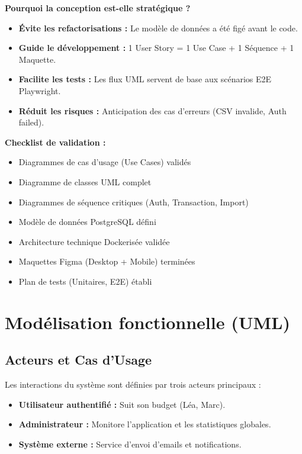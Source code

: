 \begin{conseil}
\textbf{Pourquoi la conception est-elle stratégique ?}
\begin{itemize}
    \item \textbf{Évite les refactorisations :} Le modèle de données a été figé avant le code.
    \item \textbf{Guide le développement :} 1 User Story = 1 Use Case + 1 Séquence + 1 Maquette.
    \item \textbf{Facilite les tests :} Les flux UML servent de base aux scénarios E2E Playwright.
    \item \textbf{Réduit les risques :} Anticipation des cas d'erreurs (CSV invalide, Auth failed).
\end{itemize}

\textbf{Checklist de validation :}
\begin{itemize}
    \item[\mycheckmark] Diagrammes de cas d'usage (Use Cases) validés
    \item[\mycheckmark] Diagramme de classes UML complet
    \item[\mycheckmark] Diagrammes de séquence critiques (Auth, Transaction, Import)
    \item[\mycheckmark] Modèle de données PostgreSQL défini
    \item[\mycheckmark] Architecture technique Dockerisée validée
    \item[\mycheckmark] Maquettes Figma (Desktop + Mobile) terminées
    \item[\mycheckmark] Plan de tests (Unitaires, E2E) établi
\end{itemize}
\end{conseil}


\section{Modélisation fonctionnelle (UML)}

\subsection{Acteurs et Cas d'Usage}

Les interactions du système sont définies par trois acteurs principaux :
\begin{itemize}
    \item \textbf{Utilisateur authentifié :} Suit son budget (Léa, Marc).
    \item \textbf{Administrateur :} Monitore l'application et les statistiques globales.
    \item \textbf{Système externe :} Service d'envoi d'emails et notifications.
\end{itemize}

